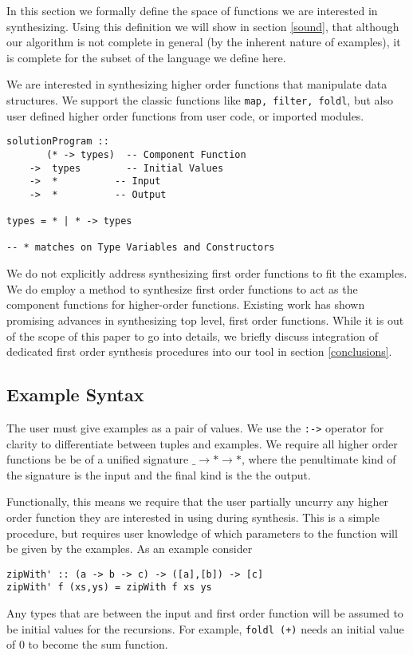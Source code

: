 In this section we formally define the space of functions we are interested in synthesizing. Using this definition we will show in section \ref{sound}, that although our algorithm is not complete in general (by the inherent nature of examples), it is complete for the subset of the language we define here.

We are interested in synthesizing higher order functions that manipulate data structures. We support the classic functions like \texttt{map, filter, foldl}, but also user defined higher order functions from user code, or imported modules. 

\begin{lstlisting}
solutionProgram ::
       (* -> types)  -- Component Function
    ->  types        -- Initial Values
    ->  *          -- Input
    ->  *          -- Output

types = * | * -> types

-- * matches on Type Variables and Constructors
\end{lstlisting}

We do not explicitly address synthesizing first order functions to fit the examples. We do employ a method to synthesize first order functions to act as the component functions for higher-order functions. Existing work has shown promising advances in synthesizing top level, first order functions\cite{potential, reviewers}. While it is out of the scope of this paper to go into details, we briefly discuss integration of dedicated first order synthesis procedures into our tool in section \ref{conclusions}.


\subsection{Example Syntax}\label{exampleSyntax}
The user must give examples as a pair of values. We use the \texttt{:->} operator for clarity to differentiate between tuples and examples.
We require all higher order functions be be of a unified signature \texttt{$\_ \to * \to *$}, where the penultimate kind of the signature is the input and the final kind is the the output.  

Functionally, this means we require that the user partially uncurry any higher order function they are interested in using during synthesis. This is a simple procedure, but requires user knowledge of which parameters to the function will be given by the examples. As an example consider 

\begin{lstlisting}
zipWith' :: (a -> b -> c) -> ([a],[b]) -> [c]
zipWith' f (xs,ys) = zipWith f xs ys
\end{lstlisting}

Any types that are between the input and first order function will be assumed to be initial values for the recursions. For example, \texttt{foldl (+)} needs an initial value of 0 to become the sum function.

